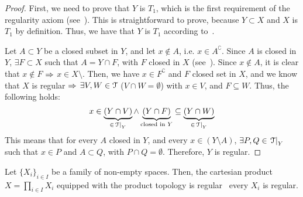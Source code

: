 \begin{proof}
	First, we need to prove that $Y$ is $T_1$, which is the first requirement of the regularity axiom (see~).
	This is straightforward to prove, because $Y\subset X$ and $X$ is $T_1$ by definition. Thus, we have that $Y$ is $T_1$ according to~.

	Let $A\subset Y$ be a closed subset in $Y$, and let $x\notin A$, i.e. $x\in A^\complement$. Since $A$ is closed in $Y$, $\exists F\subset X$ such that $A=Y\cap F$, with $F$ closed in $X$ (see~). Since $x\notin A$, it is clear that $x\notin F$ $\Rightarrow$ $x\in X\setminus$. Then, we have $x\in F^\complement$ and $F$ closed set in $X$, and we know that $X$ is regular $\Rightarrow$ $\exists V, W\in \EuScript{T}$ ($V\cap W =\emptyset$) with $x\in V$, and $F\subseteq W$. Thus, the following holds:
	\[
		x\in\underbrace{(Y\cap V)}_{\in \left.\EuScript{T}\right|_{Y}}\land \underbrace{(Y\cap F)}_{\text{closed in }Y}\subseteq \underbrace{(Y\cap W)}_{\in \left.\EuScript{T}\right|_{Y}}
	\]
	This means that for every $A$ closed in $Y$, and every $x\in (Y\setminus A)$, $\exists P,Q\in\left.\EuScript{T}\right|_{Y}$ such that $x\in P$ and $A\subset Q$, with $P\cap Q=\emptyset$. Therefore, $Y$ is regular.
\end{proof}

\begin{theorem}
	\label{th:regular-product-space}
	Let $\{X_i\}_{i\in I}$ be a family of non-empty spaces.
	Then, the cartesian product $X=\prod_{i\in I}X_i$ equipped with the product topology is regular \iff\ every $X_i$ is regular.
\end{theorem}

